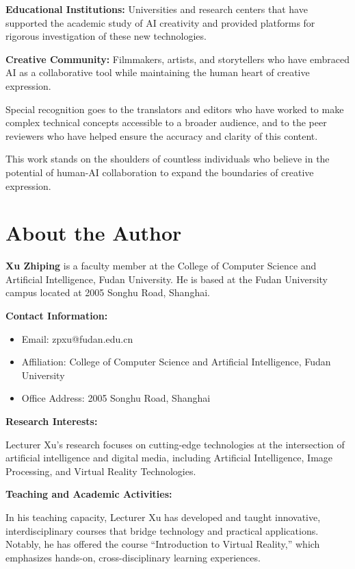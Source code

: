 \documentclass[11pt,a4paper,openright]{book}
\begin{document}
\textbf{Educational Institutions:} Universities and research centers that have supported the academic study of AI creativity and provided platforms for rigorous investigation of these new technologies.

\textbf{Creative Community:} Filmmakers, artists, and storytellers who have embraced AI as a collaborative tool while maintaining the human heart of creative expression.

Special recognition goes to the translators and editors who have worked to make complex technical concepts accessible to a broader audience, and to the peer reviewers who have helped ensure the accuracy and clarity of this content.

This work stands on the shoulders of countless individuals who believe in the potential of human-AI collaboration to expand the boundaries of creative expression.

\chapter*{About the Author}

\textbf{Xu Zhiping} is a faculty member at the College of Computer Science and Artificial Intelligence, Fudan University. He is based at the Fudan University campus located at 2005 Songhu Road, Shanghai.

\textbf{Contact Information:}
\begin{itemize}[noitemsep]
\item Email: zpxu@fudan.edu.cn
\item Affiliation: College of Computer Science and Artificial Intelligence, Fudan University
\item Office Address: 2005 Songhu Road, Shanghai
\end{itemize}

\textbf{Research Interests:}

Lecturer Xu's research focuses on cutting-edge technologies at the intersection of artificial intelligence and digital media, including Artificial Intelligence, Image Processing, and Virtual Reality Technologies.

\textbf{Teaching and Academic Activities:}

In his teaching capacity, Lecturer Xu has developed and taught innovative, interdisciplinary courses that bridge technology and practical applications. Notably, he has offered the course ``Introduction to Virtual Reality,'' which emphasizes hands-on, cross-disciplinary learning experiences.
\end{document}

